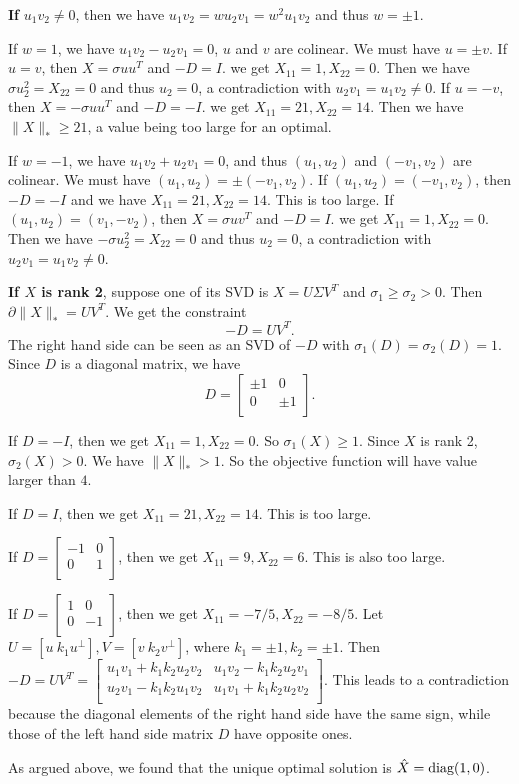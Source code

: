 \textbf{If} $u_1v_2\ne0$,
then we have $u_1v_2=wu_2v_1=w^2u_1v_2$
and thus $w=\pm1$.

If $w=1$,
we have $u_1v_2-u_2v_1=0$,
\ie $u$ and $v$ are colinear.
We must have $u=\pm v$.
If $u=v$,
then $X=\sigma uu^T$ and $-D=I$.
we get $X_{11}=1, X_{22}=0$.
Then we have $\sigma u_2^2=X_{22}=0$
and thus $u_2=0$,
a contradiction with $u_2v_1=u_1v_2\ne0$.
If $u=-v$,
then $X=-\sigma uu^T$ and $-D=-I$.
we get $X_{11}=21, X_{22}=14$.
Then we have $\|X\|_*\ge21$,
a value being too large for an optimal.

If $w=-1$,
we have $u_1v_2+u_2v_1=0$,
and thus $(u_1,u_2)$ and $(-v_1,v_2)$ are colinear.
We must have $(u_1,u_2)=\pm(-v_1,v_2)$.
If $(u_1,u_2)=(-v_1,v_2)$,
then $-D=-I$ and we have $X_{11}=21, X_{22}=14$.
This is too large.
If $(u_1,u_2)=(v_1,-v_2)$,
then $X=\sigma uv^T$ and $-D=I$.
we get $X_{11}=1, X_{22}=0$.
Then we have $-\sigma u_2^2=X_{22}=0$
and thus $u_2=0$,
a contradiction with $u_2v_1=u_1v_2\ne0$.

\textbf{If $X$ is rank 2},
suppose one of its SVD is $X=U\Sigma V^T$
and $\sigma_1\ge\sigma_2>0$.
Then $\partial\|X\|_*=UV^T$.
We get the constraint
\begin{equation}
    -D=UV^T.
\end{equation}
The right hand side can be seen as an SVD of $-D$
with $\sigma_1(D)=\sigma_2(D)=1$.
Since $D$ is a diagonal matrix,
we have
\begin{equation}
    D=
    \begin{bmatrix}
        \pm1 & 0    \\
        0    & \pm1 \\
    \end{bmatrix}.
\end{equation}

If $D=-I$,
then we get $X_{11}=1, X_{22}=0$.
So $\sigma_1(X)\ge1$.
Since $X$ is rank 2,
$\sigma_2(X)>0$.
We have $\|X\|_*>1$.
So the objective function will have value larger than $4$.

If $D=I$,
then we get $X_{11}=21, X_{22}=14$.
This is too large.

If $D=
    \begin{bmatrix}
        -1 & 0 \\
        0  & 1 \\
    \end{bmatrix}$,
then we get $X_{11}=9, X_{22}=6$.
This is also too large.

If $D=
    \begin{bmatrix}
        1 & 0  \\
        0 & -1 \\
    \end{bmatrix}$,
then we get $X_{11}=-7/5, X_{22}=-8/5$.
Let $U=[u\ k_1u^\perp],V=[v\ k_2v^\perp]$,
where $k_1=\pm1,k_2=\pm1$.
Then $-D=UV^T=\begin{bmatrix}
        u_1v_1+k_1k_2u_2v_2 & u_1v_2-k_1k_2u_2v_1 \\
        u_2v_1-k_1k_2u_1v_2 & u_1v_1+k_1k_2u_2v_2 \\
    \end{bmatrix}$.
This leads to a contradiction
because the diagonal elements of the right hand side have the same sign,
while those of the left hand side matrix $D$ have opposite ones.

As argued above,
we found that the unique optimal solution is $\hat X={\text{diag}}(1,0)$.
